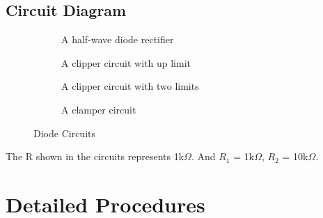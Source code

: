     \subsection{Circuit Diagram}
    \begin{figure}[h]

        \begin{subfigure}[h]{0.47\textwidth}
        \begin{center}
            
            \caption{A half-wave diode rectifier}
            \label{Lab2a}
        \end{center} 
        \end{subfigure}
    \hfill
    \vspace{0.2 cm}
        \begin{subfigure}[h]{0.47\textwidth}
        \begin{center}
            
            \caption{A clipper circuit with up limit}
            \label{Lab2b}
        \end{center}
        \end{subfigure}
    \vfill
    \vspace{0.2 cm}
        \begin{subfigure}[h]{0.47\textwidth}
        \begin{center}
             
            \caption{A clipper circuit with two limits}
            \label{Lab2c}
        \end{center}
        \end{subfigure}
    \hfill
        \begin{subfigure}[h]{0.47\textwidth}
        \begin{center}
            
            \caption{A clamper circuit}
            \label{Lab2d}
        \end{center}
        \end{subfigure}
    \caption{Diode Circuits}
    \label{l2f}

    \end{figure}
\FloatBarrier
The R shown in the circuits represents 1k$\Omega$. And $R_1$ = 1k$\Omega$, $R_2$ = 10k$\Omega$.



\section{Detailed Procedures}
